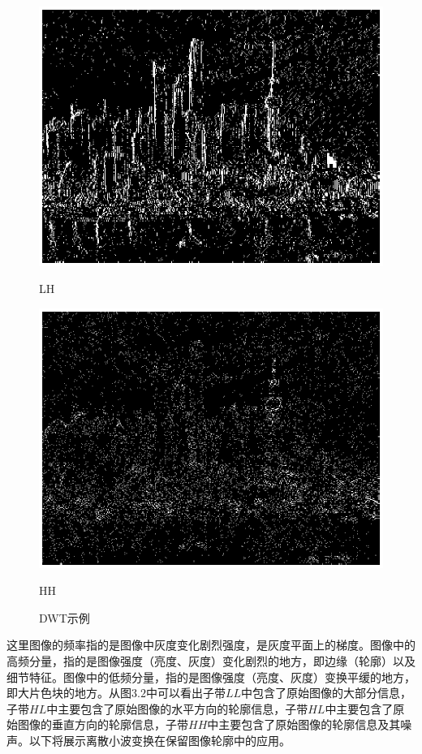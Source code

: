 \documentclass[12pt]{book}
\begin{document}
\begin{figure}[ht]
					\begin{minipage}{0.48\linewidth}
						\centerline{\includegraphics[width=1\textwidth]{./figures/LH.eps}}
						\centerline{LH}
					\end{minipage}
					\qquad
					\begin{minipage}{0.48\linewidth}
						\centerline{\includegraphics[width=1\textwidth]{./figures/HH.eps}}
						\centerline{HH}
					\end{minipage}
					\caption{DWT示例\label{DWT}}
				\end{figure}

这里图像的频率指的是图像中灰度变化剧烈强度，是灰度平面上的梯度。图像中的高频分量，指的是图像强度（亮度、灰度）变化剧烈的地方，即边缘（轮廓）以及细节特征。图像中的低频分量，指的是图像强度（亮度、灰度）变换平缓的地方，即大片色块的地方。从图$3.2$中可以看出子带$LL$中包含了原始图像的大部分信息，子带$HL$中主要包含了原始图像的水平方向的轮廓信息，子带$HL$中主要包含了原始图像的垂直方向的轮廓信息，子带$HH$中主要包含了原始图像的轮廓信息及其噪声。以下将展示离散小波变换在保留图像轮廓中的应用。
\end{document}
